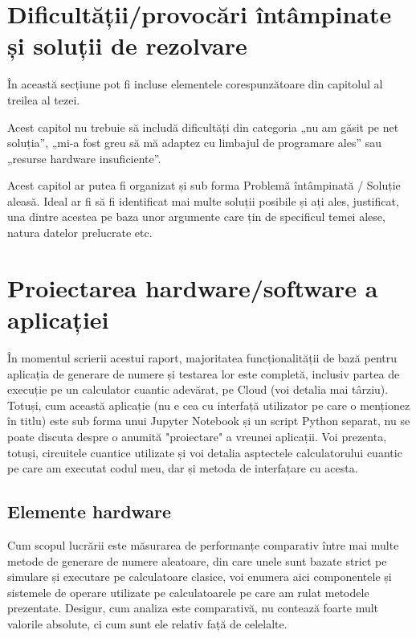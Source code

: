 \documentclass[12pt]{report}
\begin{document}
\section*{Dificultății/provocări întâmpinate și soluții de rezolvare}

În această secțiune pot fi incluse elementele corespunzătoare din capitolul al treilea al tezei.

Acest capitol nu trebuie să includă dificultăți din categoria „nu am găsit pe net soluția”, „mi-a fost greu să mă adaptez cu limbajul de programare ales” sau „resurse hardware insuficiente”.

Acest capitol ar putea fi organizat și sub forma Problemă întâmpinată / Soluție aleasă.
Ideal ar fi să fi identificat mai multe soluții posibile și ați ales, justificat, una dintre acestea pe baza unor argumente care țin de specificul temei alese, natura datelor prelucrate etc.
\fi

\section*{Proiectarea hardware/software a aplicației}

În momentul scrierii acestui raport, majoritatea funcționalității de bază pentru aplicația de generare de numere și testarea lor este completă, inclusiv partea de execuție pe un calculator cuantic adevărat, pe Cloud (voi detalia mai târziu). Totuși, cum această aplicație (nu e cea cu interfață utilizator pe care o menționez în titlu) este sub forma unui Jupyter Notebook și un script Python separat, nu se poate discuta despre o anumită "proiectare" a vreunei aplicații. Voi prezenta, totuși, circuitele cuantice utilizate și voi detalia asptectele calculatorului cuantic pe care am executat codul meu, dar și metoda de interfațare cu acesta.

\subsection*{Elemente hardware}

Cum scopul lucrării este măsurarea de performanțe comparativ între mai multe metode de generare de numere aleatoare, din care unele sunt bazate strict pe simulare și executare pe calculatoare clasice, voi enumera aici componentele și sistemele de operare utilizate pe calculatoarele pe care am rulat metodele prezentate. Desigur, cum analiza este comparativă, nu contează foarte mult valorile absolute, ci cum sunt ele relativ față de celelalte.
\end{document}
